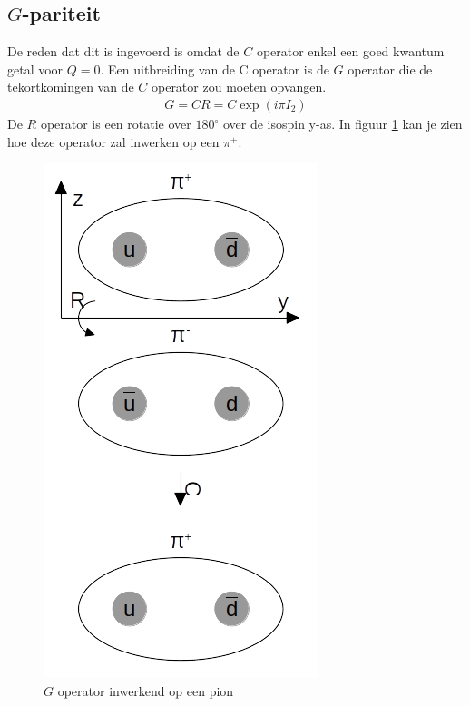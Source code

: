 \documentclass[../main.tex]{subfiles}
\begin{document}
\subsection{$G$-pariteit}%
\label{sub:g_pariteit}

De reden dat dit is ingevoerd is omdat de $C$ operator enkel een goed kwantum getal voor $Q=0$. Een uitbreiding van de C operator is de $G$ operator die de tekortkomingen van de $C$ operator zou moeten opvangen.
\begin{equation}
    \begin{aligned}
        \label{eq:g_operator}
        G=CR=C\exp(i\pi I_2)
    \end{aligned}
\end{equation}
De $R$ operator is een rotatie over $180^\circ$ over de isospin y-as. In figuur \ref{fig:pi_g_operator} kan je zien hoe deze operator zal inwerken op een $\pi^+$.

\begin{figure}[h]
    \centering
    \includegraphics[width=0.4\linewidth]{quantum_numbers/pi_g_operator.jpg}
    \caption{$G$ operator inwerkend op een pion}%
    \label{fig:pi_g_operator}
\end{figure}
\end{document}
